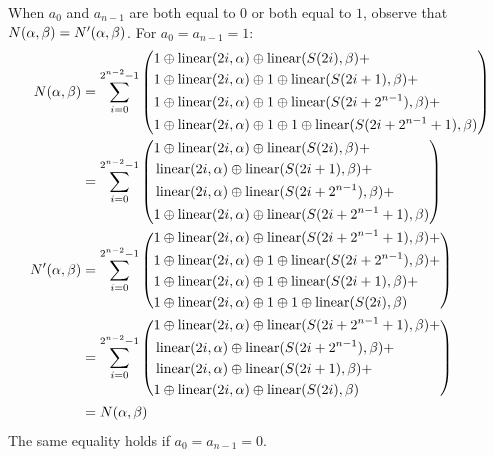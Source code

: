 When $a_0$ and $a_{n-1}$ are both equal to $0$ or both equal to $1$, observe that $N(\alpha,\beta) = N'(\alpha,\beta)$. For $a_0 = a_{n-1} = 1$:
\begin{align*}
    N(\alpha,\beta) &= 
    \sum_{i=0}^{2^{n-2}-1} \left(
\begin{aligned}
    &1 \oplus \operatorname{linear}(2i,\alpha) \oplus \operatorname{linear}(S(2i),\beta) + \\
    &1 \oplus \operatorname{linear}(2i,\alpha) \oplus 1 \oplus \operatorname{linear}(S(2i + 1),\beta) + \\
    &1 \oplus \operatorname{linear}(2i,\alpha) \oplus 1 \oplus \operatorname{linear}(S(2i + 2^{n-1}),\beta) + \\
    &1 \oplus \operatorname{linear}(2i,\alpha) \oplus 1 \oplus 1 \oplus \operatorname{linear}(S(2i + 2^{n-1} + 1),\beta)
\end{aligned}
    \right) \\
    &=
    \sum_{i=0}^{2^{n-2}-1} \left(
\begin{aligned}
    &1 \oplus \operatorname{linear}(2i,\alpha) \oplus \operatorname{linear}(S(2i),\beta) + \\
    &\operatorname{linear}(2i,\alpha) \oplus \operatorname{linear}(S(2i + 1),\beta) + \\
    &\operatorname{linear}(2i,\alpha) \oplus \operatorname{linear}(S(2i + 2^{n-1}),\beta) + \\
    &1 \oplus \operatorname{linear}(2i,\alpha) \oplus \operatorname{linear}(S(2i + 2^{n-1} + 1),\beta)
\end{aligned}
    \right) \\
    N'(\alpha,\beta) &= 
    \sum_{i=0}^{2^{n-2}-1} \left(
\begin{aligned}
    &1 \oplus \operatorname{linear}(2i,\alpha) \oplus \operatorname{linear}(S(2i + 2^{n-1} + 1),\beta) + \\
    &1 \oplus \operatorname{linear}(2i,\alpha) \oplus 1 \oplus \operatorname{linear}(S(2i + 2^{n-1}),\beta) + \\
    &1 \oplus \operatorname{linear}(2i,\alpha) \oplus 1 \oplus \operatorname{linear}(S(2i + 1),\beta) + \\
    &1 \oplus \operatorname{linear}(2i,\alpha) \oplus 1 \oplus 1 \oplus \operatorname{linear}(S(2i),\beta)
\end{aligned}
    \right) \\
    &=
    \sum_{i=0}^{2^{n-2}-1} \left(
\begin{aligned}
    &1 \oplus \operatorname{linear}(2i,\alpha) \oplus \operatorname{linear}(S(2i + 2^{n-1} + 1),\beta) + \\
    &\operatorname{linear}(2i,\alpha) \oplus \operatorname{linear}(S(2i + 2^{n-1}),\beta) + \\
    &\operatorname{linear}(2i,\alpha) \oplus \operatorname{linear}(S(2i + 1),\beta) + \\
    &1 \oplus \operatorname{linear}(2i,\alpha) \oplus \operatorname{linear}(S(2i),\beta)
\end{aligned}
    \right) \\
    &= N(\alpha,\beta)
\end{align*}
The same equality holds if $a_0 = a_{n-1} = 0$. 

